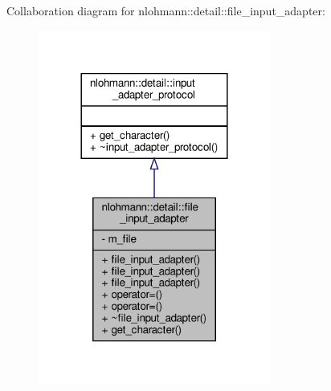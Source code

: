 Collaboration diagram for nlohmann\+:\+:detail\+:\+:file\+\_\+input\+\_\+adapter\+:
\nopagebreak
\begin{figure}[H]
\begin{center}
\leavevmode
\includegraphics[width=216pt]{classnlohmann_1_1detail_1_1file__input__adapter__coll__graph}
\end{center}
\end{figure}
